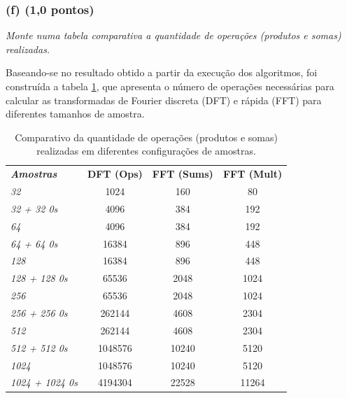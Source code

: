 \subsubsection*{(f) \textbf{(1,0 pontos)}}
\textit{Monte numa tabela comparativa a quantidade de operações (produtos e somas) realizadas.}

Baseando-se no resultado obtido a partir da execução dos algoritmos, foi construída a tabela \ref{tab:operacoes_comparativo}, que apresenta o número de operações necessárias para calcular as transformadas de Fourier discreta (DFT) e rápida (FFT) para diferentes tamanhos de amostra.

\begin{table}[ht]
    \centering
    \begin{tabular}{lccc}
    \textit{\textbf{Amostras}}            & \textbf{DFT (Ops)} & \textbf{FFT (Sums)} & \textbf{FFT (Mult)} \\
    \textit{32}                       & 1024                                & 160                  & 80                            \\
    \textit{32 + 32 0s}     & 4096                                & 384                  & 192                           \\
    \textit{64}                       & 4096                                & 384                  & 192                           \\
    \textit{64 + 64 0s}     & 16384                               & 896                  & 448                           \\
    \textit{128}                      & 16384                               & 896                  & 448                           \\
    \textit{128 + 128 0s}   & 65536                               & 2048                 & 1024                          \\
    \textit{256}                      & 65536                               & 2048                 & 1024                          \\
    \textit{256 + 256 0s}   & 262144                              & 4608                 & 2304                          \\
    \textit{512}                      & 262144                              & 4608                 & 2304                          \\
    \textit{512 + 512 0s}   & 1048576                             & 10240                & 5120                          \\
    \textit{1024}                     & 1048576                             & 10240                & 5120                          \\
    \textit{1024 + 1024 0s} & 4194304                             & 22528                & 11264                        
    \end{tabular}
    \caption{Comparativo da quantidade de operações (produtos e somas) realizadas em diferentes configurações de amostras.}
    \label{tab:operacoes_comparativo}
\end{table}


